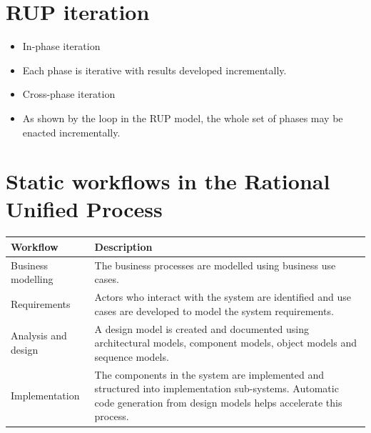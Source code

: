 \section{RUP iteration}
\begin{itemize}
\item In-phase iteration

\item Each phase is iterative with results developed incrementally. \item Cross-phase iteration
\item As shown by the loop in the RUP model, the whole set of phases may be enacted incrementally.
\end{itemize}
\newpage
\section{Static workflows in the Rational Unified Process}
\begin{table}[h!]
\centering
\begin{tabular}{ |p{3cm}|p{7cm}|  }
\hline
Workflow & Description  \\
\hline
Business modelling
& The business processes are modelled using business use cases.\\
\hline
Requirements
& Actors who interact with the system are identified and use cases are developed to model the system requirements.\\
\hline
Analysis and design
& A design model is created and documented using architectural models, component models, object models and sequence models.\\
\hline
Implementation
& The components in the system are implemented and structured	into	implementation	sub-systems. Automatic code generation from design models helps accelerate this process.\\
\hline
\end{tabular}

\label{table:T1_1}
\end{table}

\newpage
